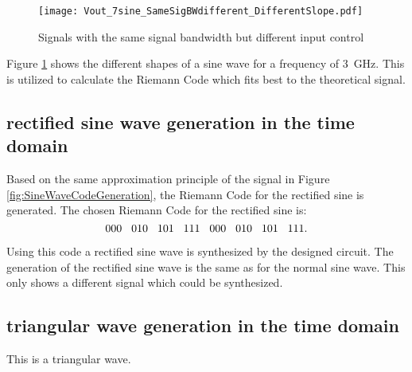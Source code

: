 \begin{figure}[htb!]
	\centering
  \texttt{[image: Vout\_7sine\_SameSigBWdifferent\_DifferentSlope.pdf]}
	\caption{Signals with the same signal bandwidth but different input control}
	\label{fig:SameSigBWDifSlope}
\end{figure}

Figure \ref{fig:SameSigBWDifSlope} shows the different shapes of a sine wave for a frequency of \SI{3}{\GHz}.
This is utilized to calculate the Riemann Code which fits best to the theoretical signal.


\subsection{rectified sine wave generation in the time domain}
Based on the same approximation principle of the signal in Figure \ref{fig:SineWaveCodeGeneration}, the Riemann Code for the rectified sine is generated. 
The chosen Riemann Code for the rectified sine is:
\begin{equation}
 000\hspace{.3cm} 010\hspace{.3cm} 101\hspace{.3cm} 111\hspace{.3cm} 000\hspace{.3cm} 010\hspace{.3cm} 101\hspace{.3cm} 111.
\end{equation}
\label{eq:RiemannCodeRectSine}

Using this code a rectified sine wave is synthesized by the designed circuit.
The generation of the rectified sine wave is the same as for the normal sine wave. 
This only shows a different signal which could be synthesized.






\subsection{triangular wave generation in the time domain}
This is a triangular wave.


